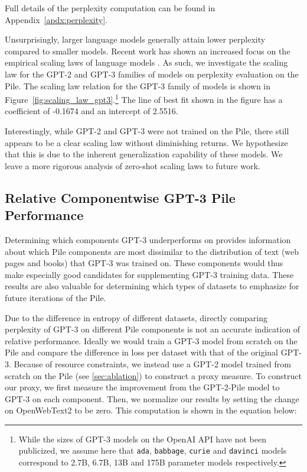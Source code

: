 Full details of the perplexity computation can be found in Appendix~\ref{apdx:perplexity}.

Unsurprisingly, larger language models generally attain lower perplexity compared to smaller models. Recent work has shown an increased focus on the empirical scaling laws of language models \citep{scaling-nlms, scaling-autoregressive}. As such, we investigate the scaling law for the GPT-2 and GPT-3 families of models on perplexity evaluation on the Pile. The scaling law relation for the GPT-3 family of models is shown in Figure~\ref{fig:scaling_law_gpt3}.\footnote{While the sizes of GPT-3 models on the OpenAI API have not been publicized, we assume here that \texttt{ada}, \texttt{babbage}, \texttt{curie} and \texttt{davinci} models correspond to 2.7B, 6.7B, 13B and 175B parameter models respectively.} The line of best fit shown in the figure has a coefficient of -0.1674 and an intercept of 2.5516.

Interestingly, while GPT-2 and GPT-3 were not trained on the Pile, there still appears to be a clear scaling law without diminishing returns. We hypothesize that this is due to the inherent generalization capability of these models. We leave a more rigorous analysis of zero-shot scaling laws to future work. 

\subsection{Relative Componentwise GPT-3 Pile Performance}\label{sec:entropy_adjusted}

Determining which components GPT-3 underperforms on provides information about which Pile components are most dissimilar to the distribution of text (web pages and books) that GPT-3 was trained on. These components would thus make especially good candidates for supplementing GPT-3 training data. These results are also valuable for determining which types of datasets to emphasize for future iterations of the Pile.

Due to the difference in entropy of different datasets, directly comparing perplexity of GPT-3 on different Pile components is not an accurate indication of relative performance. Ideally we would train a GPT-3 model from scratch on the Pile and compare the difference in loss per dataset with that of the original GPT-3. Because of resource constraints, we instead use a GPT-2 model trained from scratch on the Pile (see \ref{sec:ablation}) to construct a proxy measure. To construct our proxy, we first measure the improvement from the GPT-2-Pile model to GPT-3 on each component. Then, we normalize our results by setting the change on OpenWebText2 to be zero. This computation is shown in the equation below:

